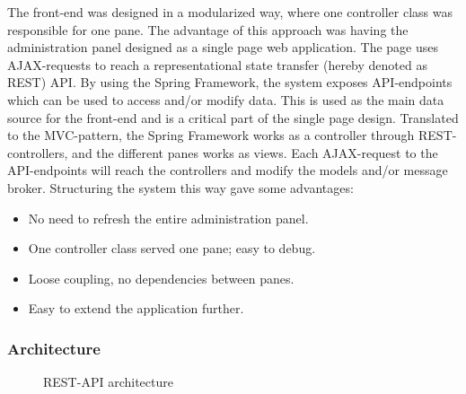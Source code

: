 The front-end was designed in a modularized way, where one controller class was responsible for one pane. The advantage of this approach was having the administration panel designed as a single page web application. The page uses AJAX-requests to reach a representational state transfer (hereby denoted as REST) API. By using the Spring Framework, the system exposes API-endpoints which can be used to access and/or modify data. This is used as the main data source for the front-end and is a critical part of the single page design. Translated to the MVC-pattern, the Spring Framework works as a controller through REST-controllers, and the different panes works as views. Each AJAX-request to the API-endpoints will reach the controllers and modify the models and/or message broker. Structuring the system this way gave some advantages: 

\begin{itemize}
    \item No need to refresh the entire administration panel.
    \item One controller class served one pane; easy to debug.
    \item Loose coupling, no dependencies between panes.
    \item Easy to extend the application further.
\end{itemize}

\subsubsection{Architecture}

\begin{center}
  \begin{figure}[ht!]
    \caption{REST-API architecture}
    \label{fig:spring}
  \end{figure}
\end{center}

